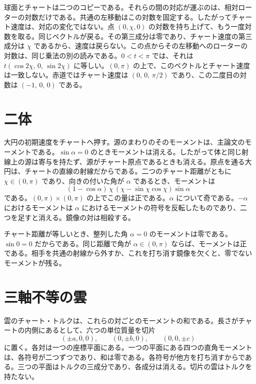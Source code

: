 \documentclass[a4paper]{article}
\begin{document}
球面とチャートは二つのコピーである。それらの間の対応が運ぶのは、相対ローターの対数だけである。共通の左移動はこの対数を固定する。したがってチャート速度は、対応の変化ではない。点 \((0,\chi,0)\) の対数を持ち上げて、もう一度対数を取る。同じベクトルが戻る。その第三成分は零であり、チャート速度の第三成分は \(\chi\) であるから、速度は戻らない。この点からその左移動へのローターの対数は、同じ乗法の別の読みである。\(0<t<\pi\) では、それは \(t(\cos 2\chi,\,0,\,\sin 2\chi)\) に等しい。\((0,\pi)\) の上で、このベクトルとチャート速度は一致しない。赤道ではチャート速度は \((0,\,0,\,\pi/2)\) であり、この二度目の対数は \((-1,\,0,\,0)\) である。

\section{二体}
\label{sec:two}

大円の初期速度をチャートへ押す。源のまわりのそのモーメントは、主論文のモーメントである。\(\sin\alpha=0\) のときモーメントは消える。したがって体と同じ射線上の源は寄与を持たず、源がチャート原点であるときも消える。原点を通る大円は、チャートの直線の射線だからである。二つのチャート距離がともに \(\chi\in(0,\pi)\) であり、向きの付いた角が \(\alpha\) であるとき、モーメントは
\begin{equation}
\label{eq:equal}
(1-\cos\alpha)\,\chi\,(\chi-\sin\chi\cos\chi)\sin\alpha
\end{equation}
である。\((0,\pi)\times(0,\pi)\) の上でこの量は正である。\(\alpha\) について奇である。\(-\alpha\) におけるモーメントは \(\alpha\) におけるモーメントの符号を反転したものであり、二つを足すと消える。鏡像の対は相殺する。

チャート距離が等しいとき、整列した角 \(\alpha=0\) のモーメントは零である。\(\sin 0=0\) だからである。同じ距離で角が \(\alpha\in(0,\pi)\) ならば、モーメントは正である。相手を共通の射線から外すか、これを打ち消す鏡像を欠くと、零でないモーメントが残る。

\section{三軸不等の雲}
\label{sec:cloud}

雲のチャート・トルクは、これらの対ごとのモーメントの和である。長さがチャートの内側にあるとして、六つの単位質量を切片
\[
(\pm a,0,0),\qquad (0,\pm b,0),\qquad (0,0,\pm c)
\]
に置く。各対は一つの座標平面にある。一つの平面にある四つの直角モーメントは、各符号が二つずつであり、和は零である。各符号が他方を打ち消すからである。三つの平面はトルクの三成分であり、各成分は消える。切片の雲はトルクを持たない。
\end{document}
